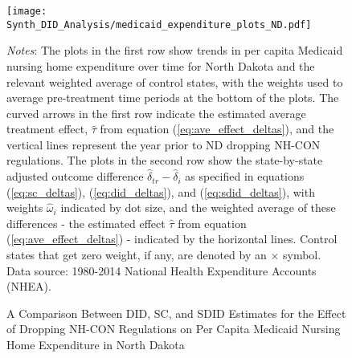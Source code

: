 \documentclass[../Main.tex]{subfiles}
\begin{document}
\newpage
\begin{figure}[t] 
	\begin{center}
	\caption{\label{fig:med_exp_plots_} \centering A Comparison Between DID, SC, and SDID Estimates for the Effect of Dropping NH-CON Regulations on Per Capita Medicaid Nursing Home Expenditure in North Dakota}
    \texttt{[image: Synth\_DID\_Analysis/medicaid\_expenditure\_plots\_ND.pdf]}
    \end{center}
    \footnotesize
		\textit{Notes}: The plots in the first row show trends in per capita Medicaid nursing home expenditure over time for North Dakota and the relevant weighted average of control states, with the weights used to average pre-treatment time periods at the bottom of the plots. The curved arrows in the first row indicate the estimated average treatment effect, $\hat{\tau}$ from equation (\ref{eq:ave_effect_deltas}), and the vertical lines represent the year prior to ND dropping NH-CON regulations. The plots in the second row show the state-by-state adjusted outcome difference $\hat{\delta}_{tr}-\hat{\delta}_i$ as specified in equations (\ref{eq:sc_deltas}), (\ref{eq:did_deltas}), and (\ref{eq:sdid_deltas}), with weights $\hat{\omega}_i$ indicated by dot size, and the weighted average of these differences - the estimated effect $\hat{\tau}$ from equation (\ref{eq:ave_effect_deltas}) - indicated by the horizontal lines. Control states that get zero weight, if any, are denoted by an $\times$ symbol. Data source: 1980-2014 National Health Expenditure Accounts (NHEA).
\end{figure}
\clearpage
\end{document}
